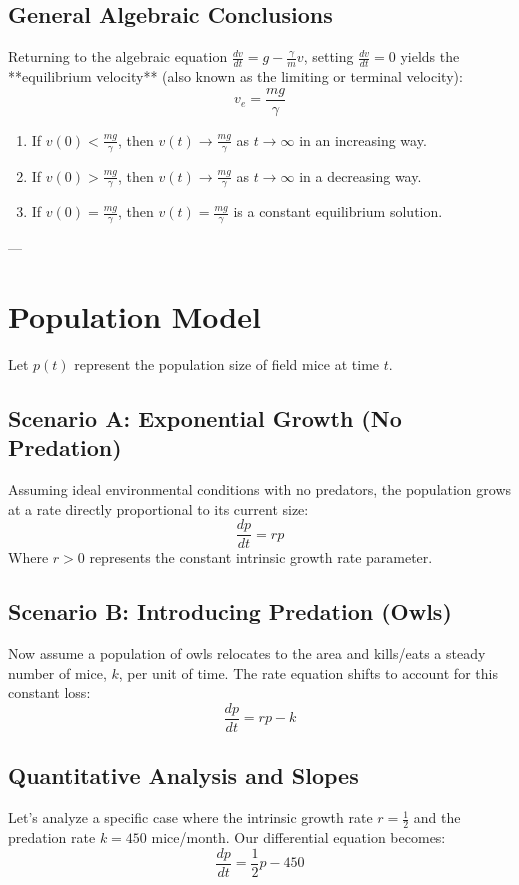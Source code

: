 \documentclass[11pt]{article}
\begin{document}
\subsection{General Algebraic Conclusions}
Returning to the algebraic equation $\frac{dv}{dt} = g - \frac{\gamma}{m}v$, setting $\frac{dv}{dt} = 0$ yields the **equilibrium velocity** (also known as the limiting or terminal velocity):
\[
  v_e = \frac{mg}{\gamma}
\]
\begin{enumerate}
    \item If $v(0) < \frac{mg}{\gamma}$, then $v(t) \to \frac{mg}{\gamma}$ as $t \to \infty$ in an increasing way.
    \item If $v(0) > \frac{mg}{\gamma}$, then $v(t) \to \frac{mg}{\gamma}$ as $t \to \infty$ in a decreasing way.
    \item If $v(0) = \frac{mg}{\gamma}$, then $v(t) = \frac{mg}{\gamma}$ is a constant equilibrium solution.
\end{enumerate}

---

\section{Population Model}
Let $p(t)$ represent the population size of field mice at time $t$. 

\subsection{Scenario A: Exponential Growth (No Predation)}
Assuming ideal environmental conditions with no predators, the population grows at a rate directly proportional to its current size:
\[
  \frac{dp}{dt} = rp
\]
Where $r > 0$ represents the constant intrinsic growth rate parameter.

\subsection{Scenario B: Introducing Predation (Owls)}
Now assume a population of owls relocates to the area and kills/eats a steady number of mice, $k$, per unit of time. The rate equation shifts to account for this constant loss:
\[
  \frac{dp}{dt} = rp - k
\]

\subsection{Quantitative Analysis and Slopes}
Let's analyze a specific case where the intrinsic growth rate $r = \frac{1}{2}$ and the predation rate $k = 450$ mice/month. Our differential equation becomes:
\[
  \frac{dp}{dt} = \frac{1}{2}p - 450
\]
\end{document}
